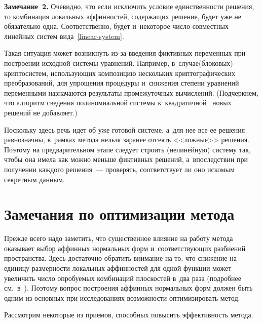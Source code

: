 \begin{multicols}{2}
\smallskip

\noindent
\textbf{Замечание~2.}
    Очевидно, что если исключить условие единственности решения, то комбинация 
локальных аффинностей, содержащих решение, будет уже не обязательно одна. 
Соответственно, будет и~некоторое число совместных линейных систем 
вида~\eqref{linear-system}.\par
    Такая ситуация может возникнуть из-за введения фиктивных переменных при 
построении исходной системы уравнений. Например, в~случае\linebreak (блоковых) 
криптосистем, использующих композицию нескольких криптографических 
преобразований, для упрощения процедуры и~снижения\linebreak
 степени уравнений переменными 
назначаются результаты промежуточных вычислений. (Подчеркнем, что алгоритм 
сведения полиномиальной сис\-те\-мы к~квадратичной~\cite[\S{}.2]{Bard2009} новых 
решений не добавляет.)


    Поскольку здесь речь идет об уже готовой системе, а~для нее все ее решения 
равнозначны, в~рамках метода нельзя заранее отсеять <<ложные>> решения. Поэтому 
на предварительном этапе следует строить (нелинейную) систему так, чтобы она 
имела как можно меньше фиктивных решений, а~впоследствии при получении каждого 
решения~--- проверять, соответствует ли оно искомым секретным данным.


\section{Замечания по оптимизации метода}\label{optim}

Прежде всего надо заметить, что существенное влияние на работу метода оказывает 
выбор аффинных нормальных форм и~соответствующих раз\-би\-ений пространства. Здесь 
достаточно обратить внимание на то, что снижение на единицу размерности 
локальных аффинностей для одной функции может увеличить число опробуемых 
комбинаций плоскостей в~два раза (подробнее см.\ в~\cite{LSF2019}).
Поэтому вопрос построения аффинных нормальных форм должен быть одним из основных 
при исследованиях возможности оптимизировать метод.

Рассмотрим некоторые из приемов, способных повысить эффективность метода.

\vspace*{-9pt}


\end{multicols}
